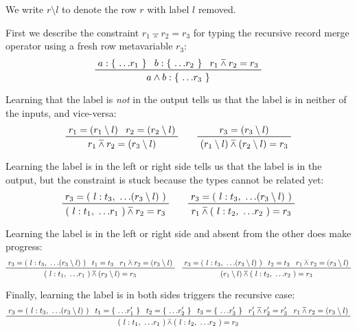 \documentclass[11pt, twoside, reqno]{book}
\providecommand{\wedgeonwedge}{\barwedge}
\begin{document}
We write \(r \setminus l\) to denote the row \(r\) with label \(l\) removed.

First we describe the constraint \(r_1 \wedgeonwedge r_2 = r_3\) for typing the recursive record merge operator using a fresh row metavariable \(r_3\):
\begin{displaymath}
\prftree{a : \{\ \dots\!r_1\ \}}{b : \{\ \dots\!r_2\ \}}{r_1 \wedgeonwedge r_2 = r_3}{a \land b : \{\ \dots\!r_3\ \}}
\end{displaymath}

Learning that the label is \emph{not} in the output tells us that the label is in neither of the inputs, and vice-versa:
\begin{displaymath}
\prftree{r_1 = (r_1 \setminus l)}{r_2 = (r_2 \setminus l)}{r_1 \wedgeonwedge r_2 = (r_3 \setminus l)}
\qquad
\prftree{r_3 = (r_3 \setminus l)}{(r_1 \setminus l) \wedgeonwedge (r_2 \setminus l) = r_3}
\end{displaymath}

Learning the label is in the left or right side tells us that the label is in the output, but the constraint is stuck because the types cannot be related yet:
\begin{displaymath}
\prftree
  {r_3 = (\ l : t_3,\ \dots\!(r_3 \setminus l)\ )}
  {(\ l : t_1,\ \dots\!r_1\ ) \wedgeonwedge r_2 = r_3}
\qquad
\prftree
  {r_3 = (\ l : t_3,\ \dots\!(r_3 \setminus l)\ )}
  {r_1 \wedgeonwedge (\ l : t_2,\ \dots\!r_2\ ) = r_3}
\end{displaymath}

Learning the label is in the left or right side and absent from the other does make progress:
\begin{displaymath}
\prftree
  {r_3 = (\ l : t_3,\ \dots\!(r_3 \setminus l)\ )}
  {t_1 = t_3}
  {r_1 \wedgeonwedge r_2 = (r_3 \setminus l)}
  {(\ l : t_1,\ \dots\!r_1\ ) \wedgeonwedge (r_2 \setminus l) = r_3}
\quad
\prftree
  {r_3 = (\ l : t_3,\ \dots\!(r_3 \setminus l)\ )}
  {t_2 = t_3}
  {r_1 \wedgeonwedge r_2 = (r_3 \setminus l)}
  {(r_1 \setminus l) \wedgeonwedge (\ l : t_2,\ \dots\!r_2\ ) = r_3}
\end{displaymath}

Finally, learning the label is in both sides triggers the recursive case:
\begin{displaymath}
\prftree
  {r_3 = (\ l : t_3,\ \dots\!(r_3 \setminus l)\ )}
  {t_1 = \{\ \dots\!r^\prime_1\ \}}
  {t_2 = \{\ \dots\!r^\prime_2\ \}}
  {t_3 = \{\ \dots\!r^\prime_3\ \}}
  {r^\prime_1 \wedgeonwedge r^\prime_2 = r^\prime_3}
  {r_1 \wedgeonwedge r_2 = (r_3 \setminus l)}
  {(\ l : t_1,\ \dots\!r_1\ ) \wedgeonwedge (\ l : t_2,\ \dots\!r_2\ ) = r_3}
\end{displaymath}
\end{document}
